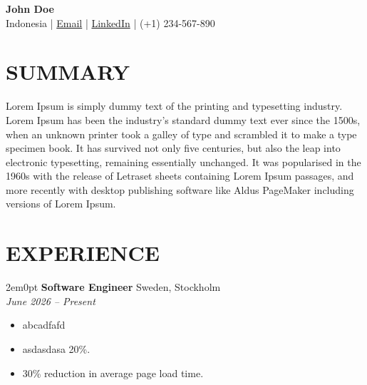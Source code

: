 \documentclass[11pt, a4paper]{article} %
\newenvironment{subs}
  {\begin{adjustwidth}{2em}{0pt} \footnotesize} %
  {\end{adjustwidth}}
\newcommand{\jobdetails}[3]{%
    \footnotesize \textbf{#1} \hfill #2 \\ %
    \emph{\small #3} \\ %
}
\begin{document}
\begin{center}
    \textbf{\Large John Doe}\\[3pt] %
    Indonesia | \href{mailto:john@gmail.com}{Email} | \href{https://www.linkedin.com/in/john-doe/}{LinkedIn} | (+1) 234-567-890 %
\end{center}

\section{SUMMARY}
\footnotesize %
Lorem Ipsum is simply dummy text of the printing and typesetting industry. 
Lorem Ipsum has been the industry's standard dummy text ever since the 1500s, when an unknown printer took a galley of type and scrambled it to make a type specimen book. 
It has survived not only five centuries, but also the leap into electronic typesetting, remaining essentially unchanged. It was popularised in the 1960s with the release of Letraset sheets containing Lorem Ipsum passages, and more recently with desktop publishing software like Aldus PageMaker including versions of Lorem Ipsum.
\normalsize %

\section{EXPERIENCE}

\begin{subs}
    \jobdetails{Software Engineer}{Sweden, Stockholm}{June 2026 -- Present}
    \begin{itemize}
        \item abcadfafd
        \item asdasdasa 20\%.
        \item 30\% reduction in average page load time.
    \end{itemize}
\end{subs}    

\end{document}

